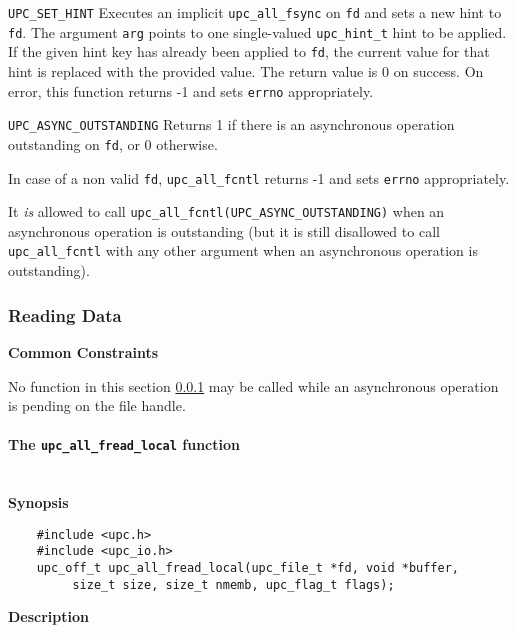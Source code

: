 \documentclass[12pt,titlepage]{article}
\newcounter{parnum}
\newcommand\np{\addtocounter{parnum}{1}\hspace{-2em}\makebox[2em][l]{\arabic{parnum}}}
\begin{document}
\begin{description}
\item{\tt UPC\_SET\_HINT}
Executes an implicit {\tt upc\_all\_fsync} on {\tt fd} and sets a new 
hint to {\tt fd}.
The argument {\tt arg} points to one single-valued {\tt upc\_hint\_t} hint 
to be applied. If the given hint key has already been applied to {\tt fd}, 
the current value for that hint is replaced with the provided value.
The return value is 0 on success. On error, this function returns 
-1 and sets {\tt errno} appropriately.
\item
{}
{\tt UPC\_ASYNC\_OUTSTANDING} 
Returns 1 if there is an asynchronous operation outstanding 
on {\tt fd}, or 0 otherwise.
\end{description}


\np In case of a non valid {\tt fd}, {\tt upc\_all\_fcntl} returns -1 and sets {\tt errno}
appropriately.

\np It \emph{is} allowed to call {\tt upc\_all\_fcntl(UPC\_ASYNC\_OUTSTANDING)} when an
asynchronous operation is outstanding (but it is still disallowed to call
{\tt upc\_all\_fcntl} with any other argument when an asynchronous operation is
outstanding).

\subsubsection{Reading Data}
\label{io-func-read}
{\bf Common Constraints}

\np No function in this section \ref{io-func-read} may be called while an asynchronous
operation is pending on the file handle.

\paragraph{The {\tt upc\_all\_fread\_local} function}\ \\

{\bf Synopsis}

\np\vspace{-2.5em}
\begin{verbatim}
    #include <upc.h>
    #include <upc_io.h>
    upc_off_t upc_all_fread_local(upc_file_t *fd, void *buffer, 
         size_t size, size_t nmemb, upc_flag_t flags);
\end{verbatim}

{\bf Description}
\end{document}
